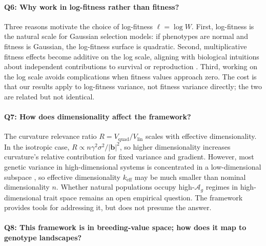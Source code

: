 \documentclass[9pt,twocolumn,twoside,lineno]{gsajnl}
\newcommand{\vect}[1]{\boldsymbol{#1}}
\newcommand{\Ag}{\ensuremath{\mathcal{A}_{g}}\xspace}
\newcommand{\Vlin}{\ensuremath{V_{\text{lin}}}\xspace}
\newcommand{\Vquad}{\ensuremath{V_{\text{quad}}}\xspace}
\newcommand{\keff}{\ensuremath{k_{\mathrm{eff}}}\xspace}
\begin{document}
\paragraph{Q6: Why work in log-fitness rather than fitness?}

Three reasons motivate the choice of log-fitness $\ell = \log W$. First, log-fitness is the natural scale for Gaussian selection models: if phenotypes are normal and fitness is Gaussian, the log-fitness surface is quadratic. Second, multiplicative fitness effects become additive on the log scale, aligning with biological intuitions about independent contributions to survival or reproduction \citep{Rice2004}. Third, working on the log scale avoids complications when fitness values approach zero. The cost is that our results apply to log-fitness variance, not fitness variance directly; the two are related but not identical.

\paragraph{Q7: How does dimensionality affect the framework?}

The curvature relevance ratio $R = \Vquad/\Vlin$ scales with effective dimensionality. In the isotropic case, $R \propto n\gamma^2\sigma^2/|\vect{b}|^2$, so higher dimensionality increases curvature's relative contribution for fixed variance and gradient. However, most genetic variance in high-dimensional systems is concentrated in a low-dimensional subspace \citep{Blows2007, Kirkpatrick2009}, so effective dimensionality $\keff$ may be much smaller than nominal dimensionality $n$. Whether natural populations occupy high-\Ag regimes in high-dimensional trait space remains an open empirical question. The framework provides tools for addressing it, but does not presume the answer.

\paragraph{Q8: This framework is in breeding-value space; how does it map to genotype landscapes?}
\end{document}
